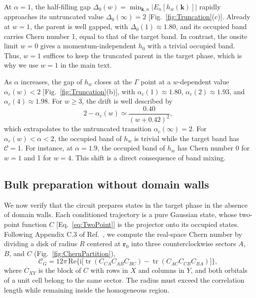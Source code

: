 \documentclass[aps,prb,twocolumn,superscriptaddress,longbibliography,floatfix]{revtex4-2}
\newcommand{\ii}{\mathrm{i}}
\newcommand{\mc}[1]{\mathcal{#1}}
\newcommand{\bfr}{\boldsymbol r}
\newcommand{\bk}{\boldsymbol k}
\begin{document}
At $\alpha=1$, the half-filling gap $\Delta_0(w)=\min_{\bk,n}|E_n[h_w(\bk)]|$ rapidly approaches its untruncated value $\Delta_0(\infty)=2$ [Fig.~\ref{fig:Truncation}(c)]. Already at $w=1$, the parent is well gapped, with $\Delta_0(1)\approx1.80$, and its occupied band carries Chern number 1, equal to that of the target band. In contrast, the onsite limit $w=0$ gives a momentum-independent $h_0$ with a trivial occupied band. Thus, $w=1$ suffices to keep the truncated parent in the target phase, which is why we use $w=1$ in the main text.

As $\alpha$ increases, the gap of $h_w$ closes at the $\Gamma$ point at a $w$-dependent value $\alpha_c(w)<2$ [Fig.~\ref{fig:Truncation}(b)], with $\alpha_c(1)\approx1.80$, $\alpha_c(2)\approx1.93$, and $\alpha_c(4)\approx1.98$. For $w\geq3$, the drift is well described by
\begin{equation}
    2-\alpha_c(w)\simeq\frac{0.40}{(w+0.42)^2},
    \label{eq:CriticalDrift}
\end{equation}
which extrapolates to the untruncated transition $\alpha_c(\infty)=2$. For $\alpha_c(w)<\alpha<2$, the occupied band of $h_w$ is trivial while the target band has $\mc C=1$. For instance, at $\alpha=1.9$, the occupied band of $h_w$ has Chern number 0 for $w=1$ and 1 for $w=4$. This shift is a direct consequence of band mixing.

\subsection{Bulk preparation without domain walls}

We now verify that the circuit prepares states in the target phase in the absence of domain walls. Each conditioned trajectory is a pure Gaussian state, whose two-point function $C$ [Eq.~\eqref{eq:TwoPoint}] is the projector onto its occupied states. Following Appendix C.3 of Ref.~\cite{Kitaev2006}, we compute the real-space Chern number by dividing a disk of radius $R$ centered at $\bfr_0$ into three counterclockwise sectors $A$, $B$, and $C$ (Fig.~\ref{fig:ChernPartition}),
\begin{equation}
    \mc C_G=12\pi\,\mathrm{Re}\Big\{\ii\big[\operatorname{tr}(C_{CA}C_{AB}C_{BC})-\operatorname{tr}(C_{AC}C_{CB}C_{BA})\big]\Big\},
    \label{eq:KitaevChern}
\end{equation}
where $C_{XY}$ is the block of $C$ with rows in $X$ and columns in $Y$, and both orbitals of a unit cell belong to the same sector. The radius must exceed the correlation length while remaining inside the homogeneous region.
\end{document}
